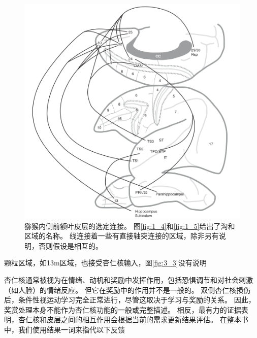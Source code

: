 \begin{figure}[!htb]
	\centering
	\includegraphics{image_pfc/Fig_3_2}
	\caption{猕猴内侧前额叶皮层的选定连接。
		图\ref{fig:1_4}和\ref{fig:1_5}给出了沟和区域的名称。
		线连接着一些有直接轴突连接的区域，除非另有说明，否则假设是相互的。}
	\label{fig:3_2}
\end{figure}


\cite{prather2001increased,morecraft2007amygdala}颗粒区域，如13m区域，也接受杏仁核输入，图\ref{fig:3_3}没有说明\cite{saleem2008complementary}\par
杏仁核通常被视为在情绪、动机和奖励中发挥作用，包括恐惧调节和对社会刺激（如人脸）的情绪反应。
但它在奖励中的作用并不是一般的。
双侧杏仁核损伤后，条件性视运动学习完全正常进行，尽管这取决于学习与奖励的关系\cite{murray1996role}。
因此，奖赏处理本身不能作为杏仁核功能的一般或完整描述。
相反，最有力的证据表明，杏仁核和皮层之间的相互作用会根据当前的需求更新结果评估\cite{baxter2002amygdala}。
在整本书中，我们使用结果一词来指代以下反馈\par


